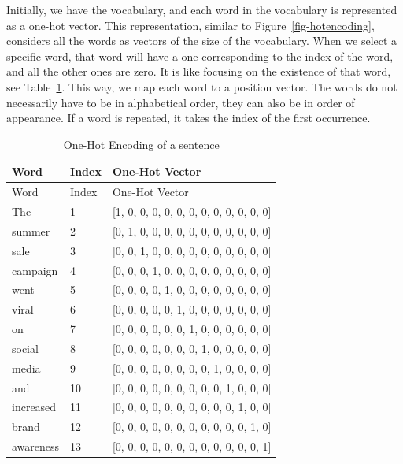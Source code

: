 Initially, we have the vocabulary, and each word in the vocabulary is
represented as a one-hot vector. This representation, similar to
Figure~\ref{fig-hotencoding}, considers all the words as vectors of the
size of the vocabulary. When we select a specific word, that word will
have a one corresponding to the index of the word, and all the other
ones are zero. It is like focusing on the existence of that word, see
Table~\ref{tbl-onehot}. This way, we map each word to a position vector.
The words do not necessarily have to be in alphabetical order, they can also be in
order of appearance. If a word is repeated, it takes the index of the
first occurrence.

\begin{longtable}[]{@{}lll@{}}
\caption{One-Hot Encoding of a
sentence}\label{tbl-onehot}\tabularnewline
\toprule\noalign{}
Word & Index & One-Hot Vector \\
\midrule\noalign{}
\endfirsthead
\toprule\noalign{}
Word & Index & One-Hot Vector \\
\midrule\noalign{}
\endhead
\bottomrule\noalign{}
\endlastfoot
The & 1 & {[}1, 0, 0, 0, 0, 0, 0, 0, 0, 0, 0, 0, 0{]} \\
summer & 2 & {[}0, 1, 0, 0, 0, 0, 0, 0, 0, 0, 0, 0, 0{]} \\
sale & 3 & {[}0, 0, 1, 0, 0, 0, 0, 0, 0, 0, 0, 0, 0{]} \\
campaign & 4 & {[}0, 0, 0, 1, 0, 0, 0, 0, 0, 0, 0, 0, 0{]} \\
went & 5 & {[}0, 0, 0, 0, 1, 0, 0, 0, 0, 0, 0, 0, 0{]} \\
viral & 6 & {[}0, 0, 0, 0, 0, 1, 0, 0, 0, 0, 0, 0, 0{]} \\
on & 7 & {[}0, 0, 0, 0, 0, 0, 1, 0, 0, 0, 0, 0, 0{]} \\
social & 8 & {[}0, 0, 0, 0, 0, 0, 0, 1, 0, 0, 0, 0, 0{]} \\
media & 9 & {[}0, 0, 0, 0, 0, 0, 0, 0, 1, 0, 0, 0, 0{]} \\
and & 10 & {[}0, 0, 0, 0, 0, 0, 0, 0, 0, 1, 0, 0, 0{]} \\
increased & 11 & {[}0, 0, 0, 0, 0, 0, 0, 0, 0, 0, 1, 0, 0{]} \\
brand & 12 & {[}0, 0, 0, 0, 0, 0, 0, 0, 0, 0, 0, 1, 0{]} \\
awareness & 13 & {[}0, 0, 0, 0, 0, 0, 0, 0, 0, 0, 0, 0, 1{]} \\
\end{longtable}

